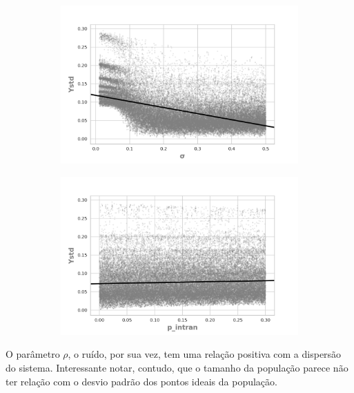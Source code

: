 \begin{figure}[H]
                \begin{subfigure}[b]{0.49\textwidth}
            \includegraphics[width=\textwidth]{ims/mutoregressions/regressionmutatingosigma.png}
          \end{subfigure}
                \begin{subfigure}[b]{0.49\textwidth}
            \includegraphics[width=\textwidth]{ims/mutoregressions/regressionmutatingop_intran.png}
    \end{subfigure}
    \label{fig:scatter1}
\end{figure}

O parâmetro \(\rho\), o ruído, por sua vez, tem uma relação positiva com a
dispersão do sistema. Interessante notar, contudo, que o tamanho da população
parece não ter relação com o desvio padrão dos pontos ideais da população.

